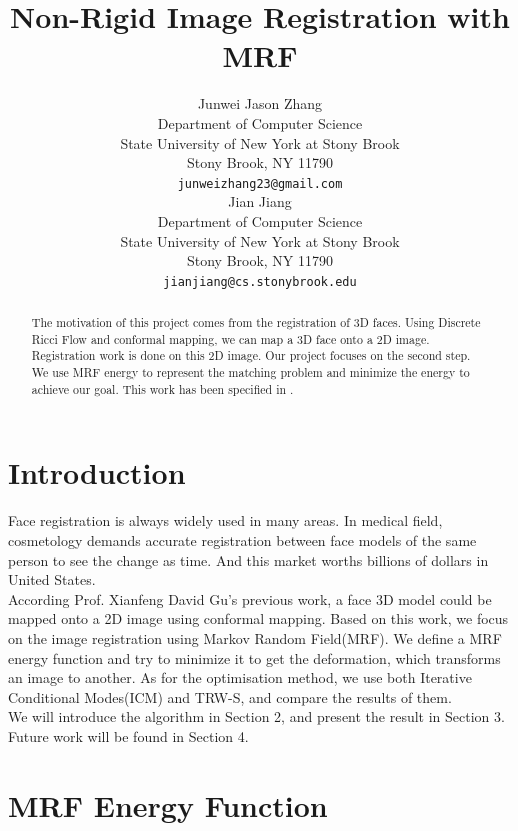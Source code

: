 \documentclass{article} %
\title{Non-Rigid Image Registration with MRF}
\author{
Junwei Jason Zhang\\
Department of Computer Science\\
State University of New York at Stony Brook\\
Stony Brook, NY 11790 \\
\texttt{junweizhang23@gmail.com} \\
\And
Jian Jiang \\
Department of Computer Science \\
State University of New York at Stony Brook \\
Stony Brook, NY 11790 \\
\texttt{jianjiang@cs.stonybrook.edu} \\
}
\begin{document}
\maketitle

\begin{abstract}
The motivation of this project comes from the registration of 3D faces. Using Discrete Ricci Flow and conformal mapping, we can map a 3D face onto a 2D image. Registration work is done on this 2D image. Our project focuses on the second step. We use MRF energy to represent the matching problem and minimize the energy to achieve our goal. This work has been specified in \cite{shekhovtsov2008efficient}.
\end{abstract}

\section{Introduction}

Face registration is always widely used in many areas. In medical field, cosmetology demands accurate registration between face models of the same person to see the change as time. And this market worths billions of dollars in United States. \\
According Prof. Xianfeng David Gu's previous work, a face 3D model could be mapped onto a 2D image using conformal mapping. Based on this work, we focus on the image registration using Markov Random Field(MRF). We define a MRF energy function and try to minimize it to get the deformation, which transforms an image to another. As for the optimisation method, we use both Iterative Conditional Modes(ICM) and TRW-S, and compare the results of them. \\
We will introduce the algorithm in Section 2, and present the result in Section 3. Future work will be found in Section 4.
\section{MRF Energy Function}
\label{MRF}
\end{document}
